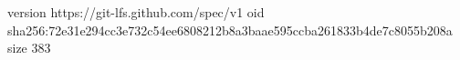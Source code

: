 version https://git-lfs.github.com/spec/v1
oid sha256:72e31e294cc3e732c54ee6808212b8a3baae595ccba261833b4de7c8055b208a
size 383
